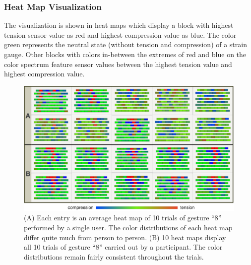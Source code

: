 \documentclass{sigchi}
\begin{document}
\subsubsection{Heat Map Visualization}

The visualization is shown in heat maps which display a block with highest tension sensor value as red and highest compression value as blue. The color green represents the neutral state (without tension and compression) of a strain gauge. Other blocks with colors in-between the extremes of red and blue on the color spectrum feature sensor values between the highest tension value and highest compression value.

\begin{figure}[t]
 \begin{center}
  \includegraphics[width=1\columnwidth]{figures/SVisualNew_v3.pdf}
  \caption{
    (A) Each entry is an average heat map of 10 trials of gesture ``8'' performed by a single user. The color distributions of each heat map differ quite much from person to person.
    (B) 10 heat maps display all 10 trials of gesture ``8'' carried out by a participant. The color distributions remain fairly consistent throughout the trials.
  }
  \label{fig:SVisualNew}
  \end{center}
\end{figure}
\end{document}

